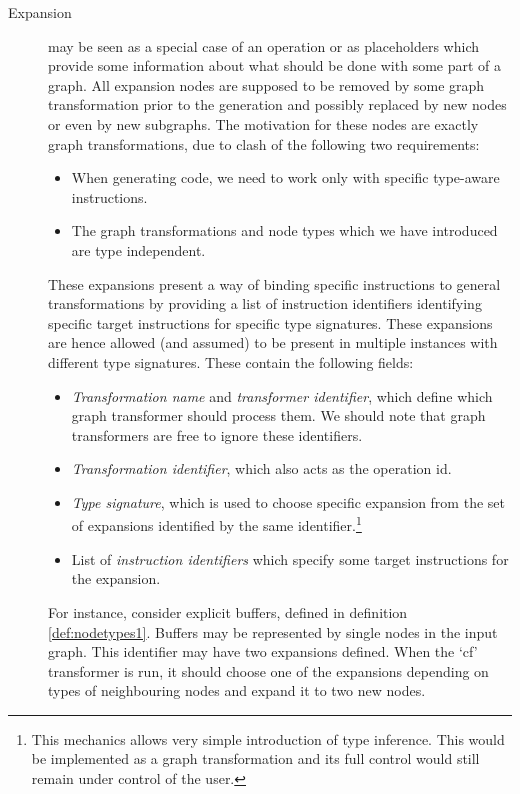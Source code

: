 \begin{description}
\begin{itemize}
    \end{itemize}
  \item[Expansion] may be seen as a special case of an operation or as placeholders which provide some information about what should be done with some part of a graph. All expansion nodes are supposed to be removed by some graph transformation prior to the generation and possibly replaced by new nodes or even by new subgraphs. The motivation for these nodes are exactly graph transformations, due to clash of the following two requirements:
    \begin{itemize}
      \item When generating code, we need to work only with specific type-aware instructions. 
      \item The graph transformations and node types which we have introduced are type independent. 
    \end{itemize}
    These expansions present a way of binding specific instructions to general transformations by providing a list of instruction identifiers identifying specific target instructions for specific type signatures. These expansions are hence allowed (and assumed) to be present in multiple instances with different type signatures. These contain the following fields:
    \begin{itemize}
      \item \emph{Transformation name} and \emph{transformer identifier}, which define which graph transformer should process them. We should note that graph transformers are free to ignore these identifiers.
      \item \emph{Transformation identifier}, which also acts as the operation id.
      \item \emph{Type signature}, which is used to choose specific expansion from the set of expansions identified by the same identifier.\footnote{This mechanics allows very simple introduction of type inference. This would be implemented as a graph transformation and its full control would still remain under control of the user.}
      \item List of \emph{instruction identifiers} which specify some target instructions for the expansion.
    \end{itemize}
    For instance, consider explicit buffers, defined in definition \ref{def:nodetypes1}. Buffers may be represented by single nodes in the input graph. This identifier may have two expansions defined. When the `cf' transformer is run, it should choose one of the expansions depending on types of neighbouring nodes and expand it to two new nodes.

\end{description}
